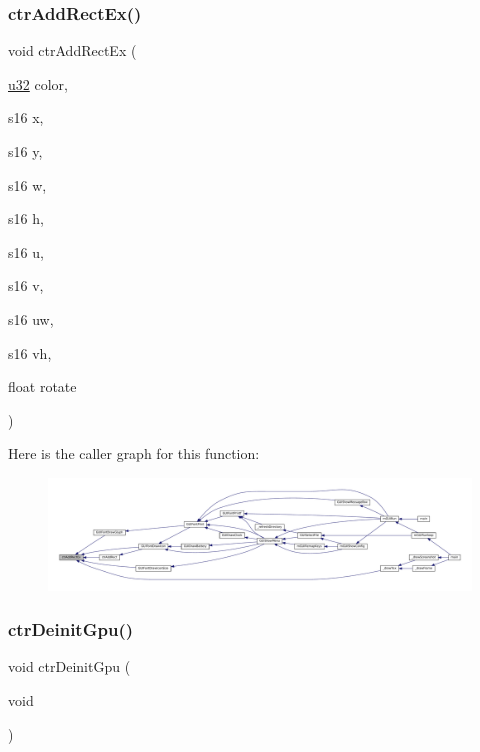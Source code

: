 \subsubsection{\texorpdfstring{ctr\+Add\+Rect\+Ex()}{ctrAddRectEx()}}
{\footnotesize\ttfamily void ctr\+Add\+Rect\+Ex (\begin{DoxyParamCaption}\item[{\mbox{\hyperlink{sqlite3_8c_a03ad5adfaeb9b7640dde78a0cc390319}{u32}}}]{color,  }\item[{s16}]{x,  }\item[{s16}]{y,  }\item[{s16}]{w,  }\item[{s16}]{h,  }\item[{s16}]{u,  }\item[{s16}]{v,  }\item[{s16}]{uw,  }\item[{s16}]{vh,  }\item[{float}]{rotate }\end{DoxyParamCaption})}

Here is the caller graph for this function\+:
\nopagebreak
\begin{figure}[H]
\begin{center}
\leavevmode
\includegraphics[width=350pt]{ctr-gpu_8h_aa59622aca4a180cff8a77bbc0397f4de_icgraph}
\end{center}
\end{figure}
\mbox{\label{ctr-gpu_8h_a351de94984c7d5ffca8dd11c840f0da1}} 
\subsubsection{\texorpdfstring{ctr\+Deinit\+Gpu()}{ctrDeinitGpu()}}
{\footnotesize\ttfamily void ctr\+Deinit\+Gpu (\begin{DoxyParamCaption}\item[{void}]{ }\end{DoxyParamCaption})}

